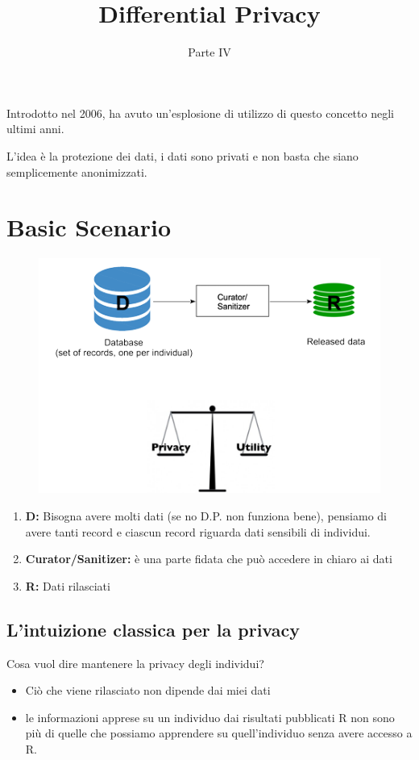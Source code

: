\documentclass{report}
\title{\huge\textbf{{Differential Privacy}}}
\date{Parte IV}
\begin{document}
\maketitle
\tableofcontents
\newpage


\noindent Introdotto nel 2006, ha avuto un'esplosione di utilizzo di questo concetto negli ultimi anni.

\noindent L'idea è la protezione dei dati, i dati sono privati e non basta che siano semplicemente anonimizzati.


\chapter{Basic Scenario}
\begin{figure}[H]
        \centering
        \includegraphics[width=0.6\linewidth]{images/basicScenario.png}
    \end{figure}

\begin{enumerate}
    \item \textbf{D:} Bisogna avere molti dati (se no D.P. non funziona bene), pensiamo di avere tanti record e ciascun record riguarda dati sensibili di individui.
    \item \textbf{Curator/Sanitizer:} è una parte fidata che può accedere in chiaro ai dati
    \item \textbf{R:} Dati rilasciati 
\end{enumerate}

\section{L'intuizione classica per la privacy}
Cosa vuol dire mantenere la privacy degli individui?
\begin{itemize}
    \item Ciò che viene rilasciato non dipende dai miei dati
    \item le informazioni apprese su un individuo dai risultati pubblicati R non sono più di quelle che possiamo apprendere su quell'individuo senza avere accesso a R.
\end{itemize}
\end{document}
